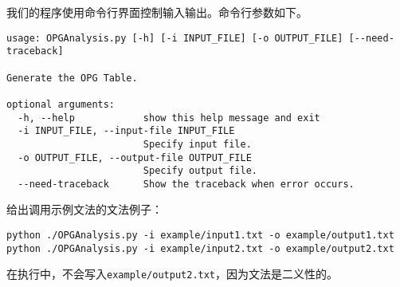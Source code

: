 我们的程序使用命令行界面控制输入输出。命令行参数如下。

\begin{lstlisting}[caption=命令行参数]
usage: OPGAnalysis.py [-h] [-i INPUT_FILE] [-o OUTPUT_FILE] [--need-traceback]

Generate the OPG Table.

optional arguments:
  -h, --help            show this help message and exit
  -i INPUT_FILE, --input-file INPUT_FILE
                        Specify input file.
  -o OUTPUT_FILE, --output-file OUTPUT_FILE
                        Specify output file.
  --need-traceback      Show the traceback when error occurs.
\end{lstlisting}

给出调用示例文法的文法例子：

\begin{lstlisting}[caption=命令行示例]
python ./OPGAnalysis.py -i example/input1.txt -o example/output1.txt
python ./OPGAnalysis.py -i example/input2.txt -o example/output2.txt
\end{lstlisting}

在执行中，不会写入\texttt{example/output2.txt}，因为文法是二义性的。
